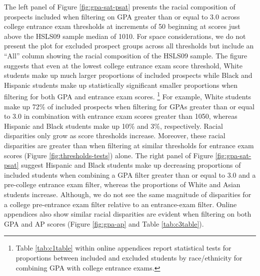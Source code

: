 \documentclass[
  12pt,
]{article}
\begin{document}
The left panel of Figure \ref{fig:gpa-sat-psat} presents the racial composition of prospects included when filtering on GPA greater than or equal to 3.0 across college entrance exam thresholds at increments of 50 beginning at scores just above the HSLS09 sample median of 1010. For space considerations, we do not present the plot for excluded prospect groups across all thresholds but include an ``All'' column showing the racial composition of the HSLS09 sample. The figure suggests that even at the lowest college entrance exam score threshold, White students make up much larger proportions of included prospects while Black and Hispanic students make up statistically significant smaller proportions when filtering for both GPA and entrance exam scores. \footnote{Table \ref{tab:c1table} within online appendices report statistical tests for proportions between included and excluded students by race/ethnicity for combining GPA with college entrance exams.} For example, White students make up 72\% of included prospects when filtering for GPAs greater than or equal to 3.0 in combination with entrance exam scores greater than 1050, whereas Hispanic and Black students make up 10\% and 3\%, respectively. Racial disparities only grow as score thresholds increase. Moreover, these racial disparities are greater than when filtering at similar thresholds for entrance exam scores (Figure \ref{fig:thresholds-tests}) alone. The right panel of Figure \ref{fig:gpa-sat-psat} suggest Hispanic and Black students make up decreasing proportions of included students when combining a GPA filter greater than or equal to 3.0 and a pre-college entrance exam filter, whereas the proportions of White and Asian students increase. Although, we do not see the same magnitude of disparities for a college pre-entrance exam filter relative to an entrance-exam filter. Online appendices also show similar racial disparities are evident when filtering on both GPA and AP scores (Figure \ref{fig:gpa-ap} and Table \ref{tab:c3table}).
\end{document}

